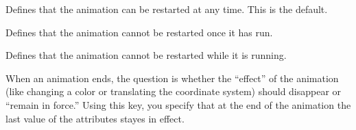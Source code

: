 \begin{command}{\pgfsys@animation@restart@always}
  Defines that the animation can be restarted at any time. This is the
  default.
\end{command}

\begin{command}{\pgfsys@animation@restart@never}
  Defines that the animation cannot be restarted once it has run.
\begin{codeexample}[width=3.5cm]
\end{codeexample}
\end{command}

\begin{command}{\pgfsys@animation@restart@whennotactive}
  Defines that the animation cannot be restarted while it is running.
\begin{codeexample}[width=3.5cm]
\end{codeexample}
\end{command}

\begin{command}{\pgfsys@animation@freezeatend{}}
  When an animation ends, the question is whether the ``effect'' of
  the animation (like changing a color or translating the coordinate
  system) should disappear or ``remain in force.'' Using this key, you
  specify that at the end of the animation the last value of the
  attributes stayes in effect.
\begin{codeexample}[width=3.5cm]
\end{codeexample}
\end{command}

